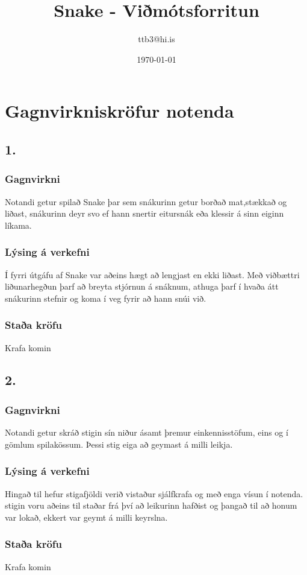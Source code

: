 \documentclass{article}
\title{Snake - Viðmótsforritun}
\author{ttb3@hi.is}
\date{\today}
\begin{document}
\maketitle


\section*{Gagnvirkniskröfur notenda}
\subsection*{1.}
\subsubsection*{Gagnvirkni}
    Notandi getur spilað Snake þar sem snákurinn getur borðað mat,stækkað og liðast, 
    snákurinn deyr svo ef hann snertir eitursnák eða klessir á sinn eiginn líkama.
\subsubsection*{Lýsing á verkefni} 
    Í fyrri útgáfu af Snake var aðeins hægt að lengjast en ekki liðast. 
    Með viðbættri liðunarhegðun þarf að breyta stjórnun á snáknum, 
    athuga þarf í hvaða átt snákurinn stefnir og koma í veg fyrir að hann snúi við.
\subsubsection*{Staða kröfu}
    Krafa komin

\subsection*{2.}
\subsubsection*{Gagnvirkni}
Notandi getur skráð stigin sín niður ásamt þremur einkennisstöfum,
eins og í gömlum spilakössum. Þessi stig eiga að geymast á milli leikja.

\subsubsection*{Lýsing á verkefni}
Hingað til hefur stigafjöldi verið vistaður sjálfkrafa og með enga vísun í notenda.
stigin voru aðeins til staðar frá því að leikurinn hafðist og þangað til að honum var lokað,
ekkert var geymt á milli keyrslna.
\subsubsection*{Staða kröfu}
    Krafa komin
\end{document}
